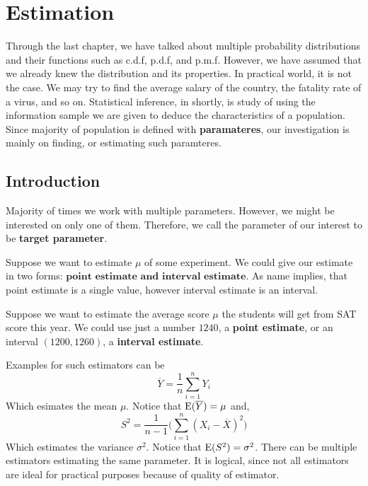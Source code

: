 \chapter{Estimation}
Through the last chapter, we have talked about multiple probability distributions and their functions such as c.d.f, p.d.f, and p.m.f. 
However, we have assumed that we already knew the distribution and its properties. In practical world, it is not the case.
We may try to find the average salary of the country, the fatality rate of a virus, and so on.
Statistical inference, in shortly, is study of using the information sample we are given to deduce the characteristics of a population.
Since majority of population is defined with \textbf{paramateres}, our investigation is mainly on finding, or estimating such paramteres.



\section{Introduction}
Majority of times we work with multiple parameters. However, we might be interested on only one of them. Therefore,  we call the parameter of our interest to be \textbf{target parameter}.
\par
    Suppose we want to estimate $\mu$ of some experiment. We could give our estimate in two forms: $\textbf{point estimate and interval estimate}$. As name implies, that point estimate is a single value, however interval estimate is an interval.

\begin{example}
    Suppose we want to estimate the average score  $\mu$ the students will get from SAT score this year. We could use just a number $1240$, a \textbf{point estimate}, or an interval $(1200,1260)$, a \textbf{interval estimate}.
\end{example}

Examples for such estimators can be
\[\overline{Y} = \frac{1}{n}\sum_{i=1}^n Y_i \]
Which esimates the mean $\mu$. Notice that ${\operatorname{E}}(\overline{Y}) = \mu$ and,
\[ S^2 = \frac{1}{n-1} \biggl(  \sum_{i = 1}^n  (X_i - \overline{X})^2 \biggr) \]
Which estimates the variance $\sigma^2$. Notice that ${\operatorname{E}}(S^2) = \sigma^2$.\newline
There can be multiple estimators estimating the same parameter. It is logical, since not all estimators are ideal for practical purposes because of quality of estimator.
